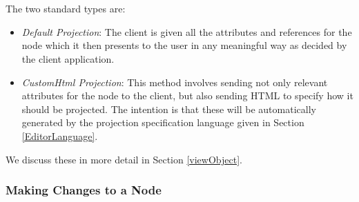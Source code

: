 \documentclass{article}
\begin{document}
\\
\\
The two standard types are:
\begin{itemize}
\item \emph{Default Projection}: The client is given all the attributes and references for the node which it then presents to the user in any meaningful way as decided by the client application.
\item \emph{CustomHtml Projection}: This method involves sending not only relevant attributes for the node to the client, but also sending HTML to specify how it should be projected. The intention is that these will be automatically generated by the projection specification language given in Section \ref{EditorLanguage}.
\end{itemize}
We discuss these in more detail in Section \ref{viewObject}.
\subsubsection{Making Changes to a Node}
\end{document}
